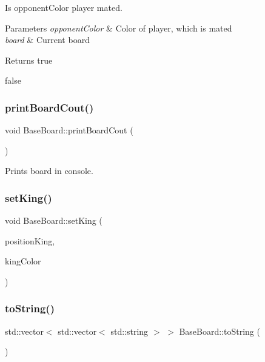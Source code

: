 Is opponent\+Color player mated. 


\begin{DoxyParams}{Parameters}
{\em opponent\+Color} & Color of player, which is mated \\
\hline
{\em board} & Current board \\
\hline
\end{DoxyParams}
\begin{DoxyReturn}{Returns}
true 

false 
\end{DoxyReturn}
\mbox{\label{class_base_board_a1c8fe600a3c0abea281b93cc8be71dd1}} 
\subsubsection{\texorpdfstring{print\+Board\+Cout()}{printBoardCout()}}
{\footnotesize\ttfamily void Base\+Board\+::print\+Board\+Cout (\begin{DoxyParamCaption}{ }\end{DoxyParamCaption})}



Prints board in console. 

\mbox{\label{class_base_board_a413af1d87b49a2ee4ce96cb0f165b01a}} 
\subsubsection{\texorpdfstring{set\+King()}{setKing()}}
{\footnotesize\ttfamily void Base\+Board\+::set\+King (\begin{DoxyParamCaption}\item[{\hyperlink{struct_position}{Position}}]{position\+King,  }\item[{\hyperlink{_piece_8h_ad7595c48bb74c0dd2a7648712a2d4985}{Piece\+Color}}]{king\+Color }\end{DoxyParamCaption})}

\mbox{\label{class_base_board_ab3a49fb5a7284d66439b785e6add260f}} 
\subsubsection{\texorpdfstring{to\+String()}{toString()}}
{\footnotesize\ttfamily std\+::vector$<$ std\+::vector$<$ std\+::string $>$ $>$ Base\+Board\+::to\+String (\begin{DoxyParamCaption}{ }\end{DoxyParamCaption})}



